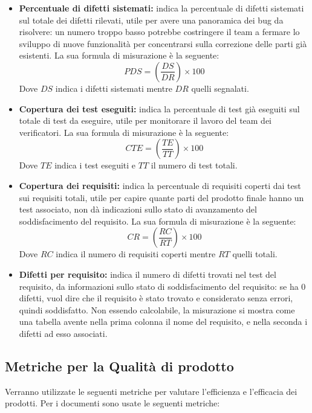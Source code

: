 \begin{itemize}
    \item \textbf{Percentuale  di  difetti  sistemati:} indica  la  percentuale  di difetti sistemati sul totale dei difetti rilevati, utile per avere una panoramica dei bug da risolvere:  un numero troppo basso potrebbe costringere il team a fermare lo sviluppo di nuove funzionalità per concentrarsi sulla correzione delle parti già esistenti.  La sua formula di misurazione è la seguente:\newline
    \[
		PDS=(\frac{DS}{DR}) \times 100
	\]	
	Dove $DS$ indica i difetti sistemati mentre $DR$ quelli segnalati.
    \item \textbf{Copertura dei test eseguiti:} indica la percentuale di test già eseguiti sul totale di test da eseguire, utile per monitorare il lavoro del team dei verificatori.  La sua formula di misurazione è la seguente:\newline
    \[
		CTE=(\frac{TE}{TT}) \times 100
	\]	
	Dove $TE$ indica i test eseguiti e $TT$ il numero di test totali.
    \item \textbf{Copertura  dei  requisiti:} indica  la  percentuale  di  requisiti coperti dai test sui requisiti totali, utile per capire quante parti del prodotto finale hanno un test associato, non dà indicazioni sullo stato di avanzamento  del  soddisfacimento  del  requisito.   La  sua  formula  di  misurazione  è la seguente:\newline
    \[
		CR=(\frac{RC}{RT}) \times 100
	\]	
	Dove $RC$ indica il numero di requisiti coperti mentre $RT$ quelli totali.
    \item \textbf{Difetti per requisito:} indica il numero di difetti trovati nel test del requisito, da informazioni sullo stato di soddisfacimento del requisito: se ha 0 difetti, vuol dire che il requisito è stato trovato e considerato senza errori, quindi soddisfatto.  Non essendo calcolabile, la misurazione si mostra come una tabella avente nella prima colonna il nome del requisito,  e nella seconda i difetti ad esso associati.
\end{itemize}

\subsection{Metriche per la Qualità di prodotto}
		Verranno  utilizzate  le  seguenti  metriche  per  valutare  l’efficienza  e  l’efficacia  dei prodotti. \newline Per i documenti sono usate le seguenti metriche:
